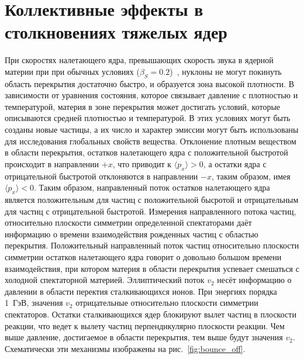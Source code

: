 \section{Коллективные эффекты в столкновениях тяжелых ядер}

При скоростях налетающего ядра, превышающих скорость звука в ядерной материи при при обычных условиях ($\beta_S=0.2$)~\cite{Weber:1998aa}, нуклоны не могут покинуть область перекрытия достаточно быстро, и образуется зона высокой плотности.
В зависимости от уравнения состояния, которое связывает давление с плотностью и температурой, материя в зоне перекрытия может достигать условий, которые описываются средней плотностью и температурой.
В этих условиях могут быть созданы новые частицы, а их число и характер эмиссии могут быть использованы для исследования глобальных свойств вещества.
Отклонение плотным веществом в области перекрытия, остатков налетающего ядра с положительной быстротой происходит в направлении $+x$, что приводит к $\langle p_x \rangle  > 0$, а остатки ядра с отрицательной быстротой отклоняются в направлении $-x$, таким образом, имея $\langle p_x \rangle < 0$.
Таким образом, направленный поток остатков налетающего ядра является положительным для частиц с положительной бысротой и отрицательным для частиц с отрицательной быстротой.
Измерения направленного потока частиц, относительно плоскости симметрии определенной спектаторами даёт информацию о времени взаимодействия рожденных частиц с областью перекрытия.
Положительный направленный поток частиц относительно плоскости симметрии остатков налетающего ядра говорит о довольно большом времени взаимодействия, при котором материя в области перекрытия успевает смешаться с холодной спектаторной материей.
Эллиптический поток $v_2$ несёт информацию о давлении в области перектия сталкивающихся ионов.
При энергиях порядка 1~ГэВ, значения $v_2$ отрицательные относительно плоскости симметрии спектаторов.
Остатки сталкивающихся ядер блокируют вылет частиц в плоскости реакции, что ведет к вылету частиц перпендикулярно плоскости реакции.
Чем выше давление, достигаемое в области перекрытия, тем выше будут значения $v_2$.
Схематически эти механизмы изображены на рис.~\ref{fig:bounce_off}.
%
